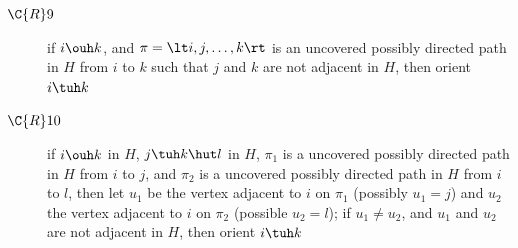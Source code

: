 \begin{algorithm}
\begin{algorithmic}[1]
\begin{description}
      \item[$\C{R}9$] if $i \ouh k$, and $\pi = \lt i, j, \dots, k \rt$ is an uncovered possibly directed path in $H$ from $i$ to $k$ such that $j$ and $k$ are not adjacent in $H$, then orient $i \tuh k$
      \item[$\C{R}10$] if $i \ouh k$ in $H$, $j \tuh k \hut l$ in $H$, $\pi_1$ is a uncovered possibly directed path in $H$ from $i$ to $j$, and $\pi_2$ is a uncovered possibly directed path in $H$ from $i$ to $l$, then let $u_1$ be the vertex adjacent to $i$ on $\pi_1$ (possibly $u_1 = j$) and $u_2$ the vertex adjacent to $i$ on $\pi_2$ (possible $u_2 = l$); if $u_1 \ne u_2$, and $u_1$ and $u_2$ are not adjacent in $H$, then orient $i \tuh k$
    \end{description}
  \label{alg:cfci:end_orient}
  \end{algorithmic}
  \caption{CFCI Algorithm.\label{alg:cfci}}
\end{algorithm}


